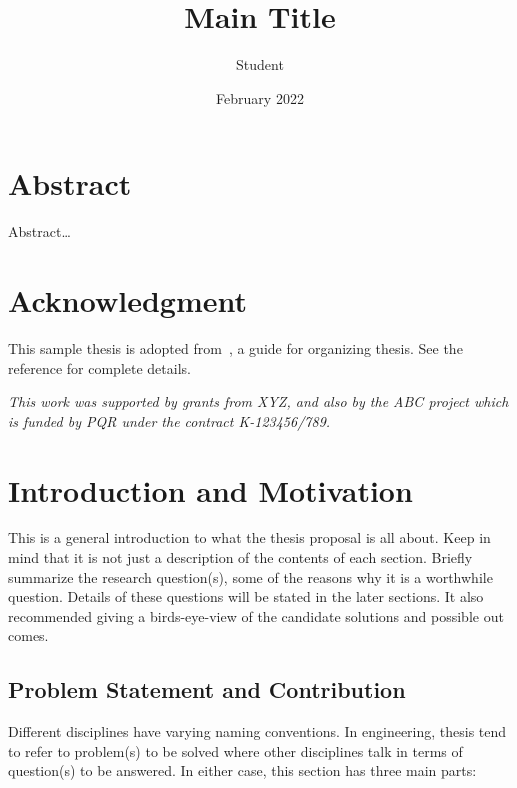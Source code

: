 \documentclass[12pt,a4paper,oneside]{book} %
\title{Main Title}
\author{Student}
\date{February 2022}
\begin{document}
\maketitle


\chapter*{Abstract}
Abstract\ldots

\certificateoforiginality

\chapter*{Acknowledgment}
This sample thesis is adopted from~\cite{iqbal2018generic}, a guide for organizing
thesis. See the reference for complete details.

\begin{center}
\emph{This work was supported by grants from XYZ, and also by the 
ABC project which is funded by PQR under the contract K-123456/789.}
\end{center}


\tableofcontents
\listoffigures
\listoftables

\resetpagenumbering



\chapter{Introduction and Motivation}
\label{c-intro}

This is a general introduction to what the thesis proposal is all about. Keep
in mind that it is not just a description of the contents of each section.
Briefly summarize the research question(s), some of the reasons why it is a
worthwhile question. Details of these questions will be stated in the later
sections. It also recommended giving a birds-eye-view of the candidate
solutions and possible out comes.


\section{Problem Statement and Contribution}
Different disciplines have varying naming conventions. In engineering, thesis
tend to refer to problem(s) to be solved where other disciplines talk in terms of
question(s) to be answered. In either case, this section has three main parts:
\end{document}
